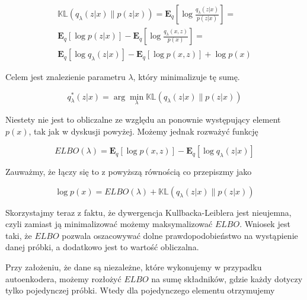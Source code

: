 \begin{equation}
\begin{split}
\mathbb { K } \mathbb { L } \left( q _ { \lambda } ( z | x ) \| p ( z | x ) \right) =
\mathbf { E } _ { q } \left[ \log \frac{q _ { \lambda } ( z | x )}{p ( z | x )} \right] = \\
\mathbf { E } _ { q } \left[ \log p ( z | x ) \right] - \mathbf { E } _ { q } \left[ \log \frac{q _ { \lambda } ( x, z )}{p ( x )} \right] = \\
\mathbf { E } _ { q } \left[ \log q _ { \lambda } ( z | x ) \right] - \mathbf { E } _ { q } [ \log p ( x , z ) ] + \log p ( x )
\end{split}
\end{equation}

Celem jest znalezienie parametru $\lambda$, który minimalizuje tę sumę.

\begin{equation}
q _ { \lambda } ^ { * } ( z | x ) = \arg \min _ { \lambda } \mathbb { K } \mathbb { L } \left( q _ { \lambda } ( z | x ) \| p ( z | x ) \right)
\end{equation}

Niestety nie jest to obliczalne ze względu an ponownie występujący element $p(x)$, tak jak w dyskusji powyżej. Możemy jednak rozważyć funkcję 

\begin{equation}
E L B O ( \lambda ) = \mathbf { E } _ { q } [ \log p ( x , z ) ] - \mathbf { E } _ { q } \left[ \log q _ { \lambda } ( z | x ) \right]
\end{equation}

Zauważmy, że łączy się to z powyższą równością co przepiszmy jako

\begin{equation}
\log p ( x ) = E L B O ( \lambda ) + \mathbb { K } \mathbb { L } \left( q _ { \lambda } ( z | x ) \| p ( z | x ) \right)
\end{equation}

Skorzystajmy teraz z faktu, że dywergencja Kullbacka-Leiblera jest nieujemna, czyli zamiast ją minimalizować możemy maksymalizować $ELBO$. Wniosek jest taki, że $ELBO$ pozwala oszacowywać dolne prawdopodobieństwo na wystąpienie danej próbki, a dodatkowo jest to wartość obliczalna.

Przy założeniu, że dane są niezależne, które wykonujemy w przypadku autoenkodera, możemy rozłożyć $ELBO$ na sumę składników, gdzie każdy dotyczy tylko pojedynczej próbki. Wtedy dla pojedynczego elementu otrzymujemy

